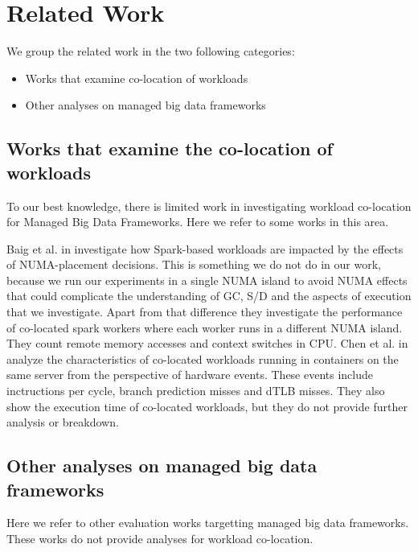 \section{Related Work}

We group the related work in the two following categories:
\begin{itemize}
\item{Works that examine co-location of workloads}
\item{Other analyses on managed big data frameworks}
\end{itemize}

\subsection{Works that examine the co-location of workloads}
To our best knowledge, there is limited work in investigating workload co-location for Managed Big Data Frameworks. Here we refer to some works in this area.


Baig et al. in \cite{NUMA} investigate how Spark-based workloads are impacted by the effects of NUMA-placement decisions. This is something we do not do in our work, because we run our experiments in a single NUMA island to avoid NUMA effects that could complicate the understanding of GC, S/D and the aspects of execution that we investigate. Apart from that difference they investigate the performance of co-located spark workers where each worker runs in a different NUMA island. They count remote memory accesses and context switches in CPU. Chen et al. in \cite{interference} analyze the characteristics of co-located workloads running in containers on the same server from the perspective of hardware events. These events include inctructions per cycle, branch prediction misses and dTLB misses. They also show the execution time of co-located workloads, but they do not provide further analysis or breakdown.

\subsection{Other analyses on managed big data frameworks}

Here we refer to other evaluation works targetting managed big data frameworks.
These works do not provide analyses for workload co-location.

